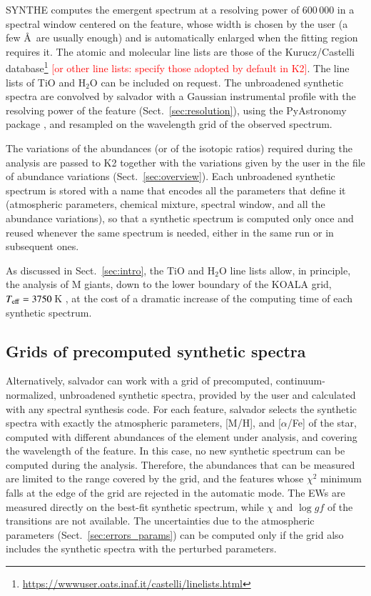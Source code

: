 \documentclass{aa}
\newcommand{\todo}[1]{\textcolor{red}{[#1]}}
\newcommand{\salvador}{salvador}   %
\begin{document}
SYNTHE computes the emergent spectrum at a resolving power of
600\,000 in a spectral window centered on the feature, whose width is
chosen by the user (a few \AA\ are usually enough) and is
automatically enlarged when the fitting region requires it. The
atomic and molecular line lists are those of the Kurucz/Castelli
database\footnote{\url{https://wwwuser.oats.inaf.it/castelli/linelists.html}}
\todo{or other line lists: specify those adopted by default in K2}.
The line lists of TiO and H$_2$O can be included on request. The
unbroadened synthetic spectra are convolved by \salvador{} with a
Gaussian instrumental profile with the resolving power of the feature
(Sect.~\ref{sec:resolution}), using the PyAstronomy package
\citep{Czesla2019}, and resampled on the wavelength grid of the
observed spectrum.

The variations of the abundances (or of the isotopic ratios) required
during the analysis are passed to K2 together with the variations
given by the user in the file of abundance variations
(Sect.~\ref{sec:overview}). Each unbroadened synthetic spectrum is
stored with a name that encodes all the parameters that define it
(atmospheric parameters, chemical mixture, spectral window, and all
the abundance variations), so that a synthetic spectrum is computed
only once and reused whenever the same spectrum is needed, either in
the same run or in subsequent ones.

As discussed in Sect.~\ref{sec:intro}, the TiO and H$_2$O line lists
allow, in principle, the analysis of M giants, down to the lower
boundary of the KOALA grid, $T_{\rm eff}=3750$\,K
\citep{Mucciarelli2026}, at the cost of a dramatic increase of the
computing time of each synthetic spectrum.

\subsection{Grids of precomputed synthetic spectra}
\label{sec:synth_grid}

Alternatively, \salvador{} can work with a grid of precomputed,
continuum-normalized, unbroadened synthetic spectra, provided by the
user and calculated with any spectral synthesis code. For each feature,
\salvador{} selects the synthetic spectra with exactly the atmospheric
parameters, [M/H], and [$\alpha$/Fe] of the star, computed with
different abundances of the element under analysis, and covering the
wavelength of the feature. In this case, no new synthetic spectrum can
be computed during the analysis. Therefore, the abundances that can be
measured are limited to the range covered by the grid, and the features
whose $\chi^2$ minimum falls at the edge of the grid are rejected in the
automatic mode. The EWs are measured directly on the best-fit
synthetic spectrum, while $\chi$ and $\log gf$ of the transitions are
not available. The uncertainties due to the atmospheric parameters
(Sect.~\ref{sec:errors_params}) can be computed only if the grid also
includes the synthetic spectra with the perturbed parameters.
\end{document}
